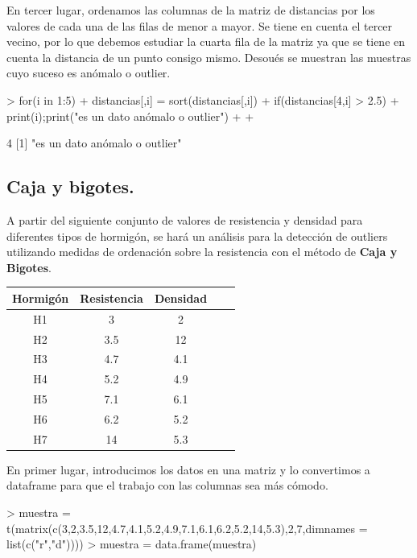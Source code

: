 \documentclass [a4paper] {article}
\begin{document}
\bigskip
En tercer lugar, ordenamos las columnas de la matriz de distancias por los valores de cada una de
las filas de menor a mayor. Se tiene en cuenta el tercer vecino, por lo que debemos estudiar la cuarta 
fila de la matriz ya que se tiene en cuenta la distancia de un punto consigo mismo.
Desoués se muestran las muestras cuyo suceso es anómalo o outlier.
\begin{Schunk}
\begin{Sinput}
> for(i in 1:5){
+     distancias[,i] = sort(distancias[,i])
+     if(distancias[4,i] > 2.5) {
+         print(i);print("es un dato anómalo o outlier")
+     }
+ }
\end{Sinput}
\begin{Soutput}
[1] 4
[1] "es un dato anómalo o outlier"
\end{Soutput}
\end{Schunk}

\subsection{Caja y bigotes.}
\bigskip
A partir del siguiente conjunto de valores de resistencia y densidad para diferentes tipos de hormigón,
se hará un análisis para la detección de outliers utilizando medidas de ordenación sobre la resistencia
con el método de \textbf{Caja y Bigotes}.

\begin{table}[H]
\begin{center}
\begin{tabular}{|c|c|c|c|c|}
\hline
Hormigón & Resistencia & Densidad\\
\hline \hline
H1 & 3 & 2 \\ \hline
H2 & 3.5 & 12 \\ \hline
H3 & 4.7 & 4.1 \\ \hline
H4 & 5.2 & 4.9 \\ \hline
H5 & 7.1 & 6.1 \\ \hline
H6 & 6.2 & 5.2 \\ \hline
H7 & 14 & 5.3 \\ \hline
\end{tabular}
\end{center}
\end{table}

\bigskip
En primer lugar, introducimos los datos en una matriz y lo convertimos a dataframe para que el trabajo con las 
columnas sea más cómodo.
\begin{Schunk}
\begin{Sinput}
> muestra = t(matrix(c(3,2,3.5,12,4.7,4.1,5.2,4.9,7.1,6.1,6.2,5.2,14,5.3),2,7,dimnames = list(c("r","d"))))
> muestra = data.frame(muestra)
\end{Sinput}
\end{Schunk}
\end{document}
